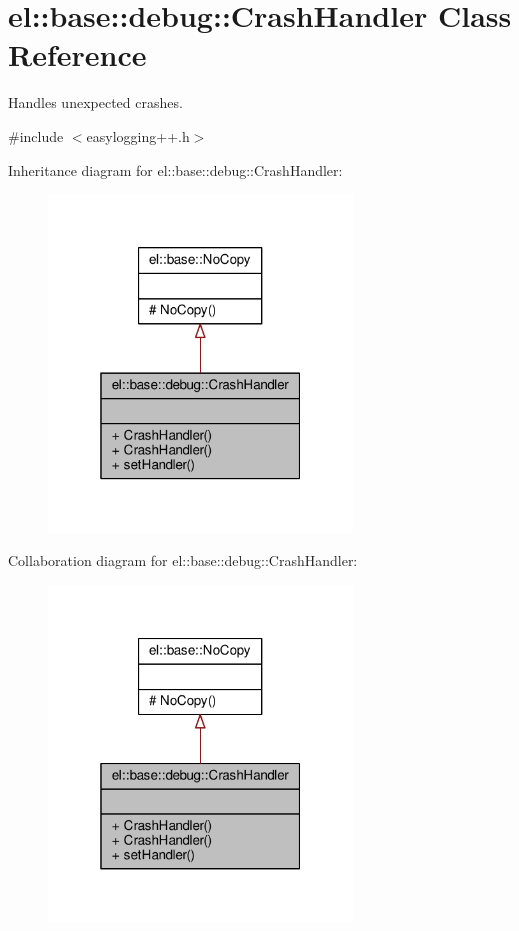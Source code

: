 \hypertarget{classel_1_1base_1_1debug_1_1CrashHandler}{}\section{el\+:\+:base\+:\+:debug\+:\+:Crash\+Handler Class Reference}
\label{classel_1_1base_1_1debug_1_1CrashHandler}


Handles unexpected crashes.  




{\ttfamily \#include $<$easylogging++.\+h$>$}



Inheritance diagram for el\+:\+:base\+:\+:debug\+:\+:Crash\+Handler\+:
\nopagebreak
\begin{figure}[H]
\begin{center}
\leavevmode
\includegraphics[width=229pt]{d6/db2/classel_1_1base_1_1debug_1_1CrashHandler__inherit__graph}
\end{center}
\end{figure}


Collaboration diagram for el\+:\+:base\+:\+:debug\+:\+:Crash\+Handler\+:
\nopagebreak
\begin{figure}[H]
\begin{center}
\leavevmode
\includegraphics[width=229pt]{d3/dac/classel_1_1base_1_1debug_1_1CrashHandler__coll__graph}
\end{center}
\end{figure}
